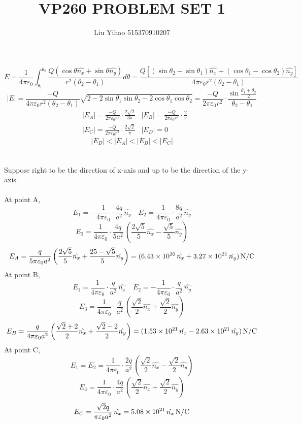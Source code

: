 \documentclass{article}
\title{VP260 PROBLEM SET 1}
\author{Liu Yihao 515370910207}
\date{}
\begin{document}
\maketitle

\section{}
$$E=\frac{1}{4\pi\varepsilon_0}\int_{\theta_1}^{\theta_2}\frac{Q(\cos\theta\hat{n_x}+\sin\theta\hat{n_y})}{r^2(\theta_2-\theta_1)}d\theta
=\frac{Q[(\sin\theta_2-\sin\theta_1)\hat{n_x}+(\cos\theta_1-\cos\theta_2)\hat{n_y}]}{4\pi\varepsilon_0r^2(\theta_2-\theta_1)}$$
$$|E|=\frac{-Q}{4\pi\varepsilon_0r^2(\theta_2-\theta_1)}\sqrt{2-2\sin\theta_1\sin\theta_2-2\cos\theta_1\cos\theta_2}=\frac{-Q}{2\pi\varepsilon_0r^2}\cdot\frac{\sin\frac{\theta_1+\theta_2}{2}}{\theta_2-\theta_1}$$
\begin{align*}
&|E_A|=\frac{-Q}{2\pi\varepsilon_0r^2}\cdot\frac{2\sqrt{2}}{3\pi}
&|E_B|=\frac{-Q}{2\pi\varepsilon_0r^2}\cdot\frac{2}{\pi}\\
&|E_C|=\frac{-Q}{2\pi\varepsilon_0r^2}\cdot\frac{2\sqrt{2}}{\pi}
&|E_D|=0
\end{align*}
$$|E_D|<|E_A|<|E_B|<|E_C|$$

\section{}
Suppose right to be the direction of x-axis and up to be the direction of the y-axis.\\
\\
At point A,
$$E_1=-\frac{1}{4\pi\varepsilon_0}\cdot\frac{4q}{a^2}\,\hat{n_y}\quad
E_2=\frac{1}{4\pi\varepsilon_0}\cdot\frac{8q}{a^2}\,\hat{n_y}$$
$$E_3=\frac{1}{4\pi\varepsilon_0}\cdot\frac{4q}{5a^2}\,\left(\frac{2\sqrt{5}}{5}\hat{n_x}-\frac{\sqrt{5}}{5}\hat{n_y}\right)$$
$$E_A=\frac{q}{5\pi\varepsilon_0a^2}\left(\frac{2\sqrt{5}}{5}\hat{n_x}+\frac{25-\sqrt{5}}{5}\hat{n_y}\right)
=(6.43\times10^{20}\,\hat{n_x}+3.27\times10^{21}\,\hat{n_y})\,\rm{N/C}$$
At point B,
$$E_1=\frac{1}{4\pi\varepsilon_0}\cdot\frac{q}{a^2}\,\hat{n_x}\quad
E_2=-\frac{1}{4\pi\varepsilon_0}\cdot\frac{q}{a^2}\,\hat{n_y}$$
$$E_3=\frac{1}{4\pi\varepsilon_0}\cdot\frac{q}{a^2}\,\left(\frac{\sqrt{2}}{2}\hat{n_x}+\frac{\sqrt{2}}{2}\hat{n_y}\right)$$
$$E_B=\frac{q}{4\pi\varepsilon_0a^2}\left(\frac{\sqrt{2}+2}{2}\hat{n_x}+\frac{\sqrt{2}-2}{2}\hat{n_y}\right)
=(1.53\times10^{21}\,\hat{n_x}-2.63\times10^{21}\,\hat{n_y})\,\rm{N/C}$$
At point C,
$$E_1=E_2=\frac{1}{4\pi\varepsilon_0}\cdot\frac{2q}{a^2}\,\left(\frac{\sqrt{2}}{2}\hat{n_x}-\frac{\sqrt{2}}{2}\hat{n_y}\right)$$
$$E_3=\frac{1}{4\pi\varepsilon_0}\cdot\frac{4q}{a^2}\,\left(\frac{\sqrt{2}}{2}\hat{n_x}+\frac{\sqrt{2}}{2}\hat{n_y}\right)$$
$$E_C=\frac{\sqrt{2}q}{\pi\varepsilon_0a^2}\,\hat{n_x}
=5.08\times10^{21}\,\hat{n_x}\,\rm{N/C}$$
\end{document}

